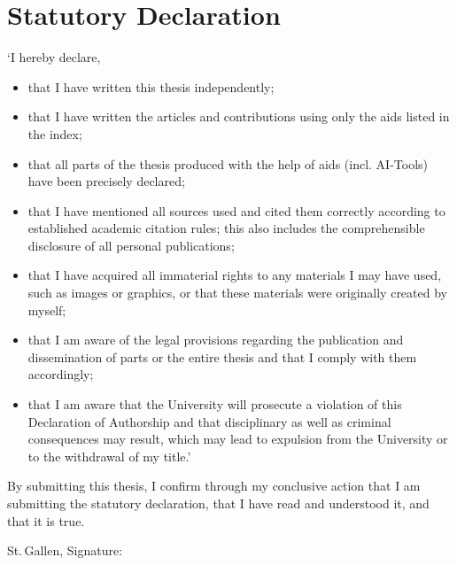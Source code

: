 
\chapter*{Statutory Declaration}

`I hereby declare,

\begin{itemize}
    \item that I have written this thesis independently;
    \item that I have written the articles and contributions using only the aids listed in the index;
    \item that all parts of the thesis produced with the help of aids (incl. AI-Tools) have been precisely declared;
    \item that I have mentioned all sources used and cited them correctly according to established academic citation rules; this also includes the comprehensible disclosure of all personal publications;
    \item that I have acquired all immaterial rights to any materials I may have used, such as images or graphics, or that these materials were originally created by myself;
    \item that I am aware of the legal provisions regarding the publication and dissemination of parts or the entire thesis and that I comply with them accordingly;
    \item that I am aware that the University will prosecute a violation of this Declaration of Authorship and that disciplinary as well as criminal consequences may result, which may lead to expulsion from the University or to the withdrawal of my title.'
\end{itemize}

\noindent
By submitting this thesis, I confirm through my conclusive action that I am submitting the statutory declaration, that I have read and understood it, and that it is true.

\vspace{15mm}
\noindent
St.\,Gallen,
\makeatletter
\@degreedate{}
\makeatother
\hspace{.2\linewidth} Signature: